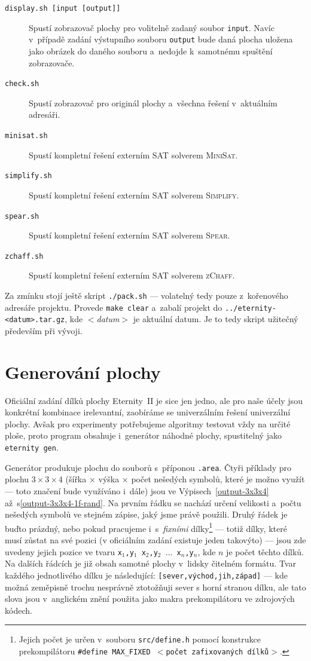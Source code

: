 \documentclass[11pt, titlepage]{report}
\begin{document}
\begin{description}
\item[\texttt{display.sh [input [output]]}] Spustí zobrazovač plochy pro volitelně zadaný soubor \texttt{input}. Navíc v~případě zadání výstupního souboru \texttt{output} bude daná plocha uložena jako obrázek do daného souboru a~nedojde k~samotnému spuštění zobrazovače.
\item[\texttt{check.sh}] Spustí zobrazovač pro originál plochy a~všechna řešení v~aktuálním adresáři.
\item[\texttt{minisat.sh}] Spustí kompletní řešení externím SAT solverem \textsc{MiniSat}.
\item[\texttt{simplify.sh}] Spustí kompletní řešení externím SAT solverem \textsc{Simplify}.
\item[\texttt{spear.sh}] Spustí kompletní řešení externím SAT solverem \textsc{Spear}.
\item[\texttt{zchaff.sh}] Spustí kompletní řešení externím SAT solverem \textsc{zChaff}.
\end{description}

Za zmínku stojí ještě skript \texttt{./pack.sh} --- volatelný tedy pouze z~kořenového adresáře projektu. Provede \texttt{make clear} a~zabalí projekt do \texttt{../eternity-<datum>.tar.gz}, kde \emph{$<$datum$>$} je aktuální datum. Je to tedy skript užitečný především při vývoji.

\section{Generování plochy}
\label{sec:ovladani-generovani}

Oficiální zadání dílků plochy Eternity~II je sice jen jedno, ale pro naše účely jsou konkrétní kombinace irelevantní, zaobíráme se univerzálním řešení univerzální plochy. Avšak pro experimenty potřebujeme algoritmy testovat vždy na určité ploše, proto program obsahuje i~generátor náhodné plochy, spustitelný jako \texttt{eternity gen}.

Generátor produkuje plochu do souborů s~příponou \texttt{.area}. Čtyři příklady pro plochu $3 \times 3 \times 4$ (šířka $\times$ výška $\times$ počet nešedých symbolů, které je možno využít --- toto značení bude využíváno i~dále) jsou ve Výpisech~\ref{output-3x3x4} až~s\ref{output-3x3x4-1f-rand}. Na prvním řádku se nachází určení velikosti a~počtu nešedých symbolů ve stejném zápise, jaký jsme právě použili. Druhý řádek je buďto prázdný, nebo pokud pracujeme i~s~\emph{fixními} dílky\footnote{Jejich počet je určen v~souboru \texttt{src/define.h} pomocí konstrukce prekompilátoru \texttt{\#define MAX\_FIXED $<$počet zafixovaných dílků$>$}.} --- totiž dílky, které musí zůstat na své pozici (v oficiálním zadání existuje jeden takovýto) --- jsou zde uvedeny jejich pozice ve tvaru \texttt{x$_1$,y$_1$ x$_2$,y$_2$ $...$ x$_n$,y$_n$}, kde $n$ je počet těchto dílků. Na dalších řádcích je již obsah samotné plochy v~lidsky čitelném formátu. Tvar každého jednotlivého dílku je následující: \texttt{[sever,východ,jih,západ]} --- kde možná zeměpisně trochu nesprávně ztotožňuji sever s horní stranou dílku, ale tato slova jsou v~anglickém znění použita jako makra prekompilátoru ve zdrojových kódech.
\end{document}
